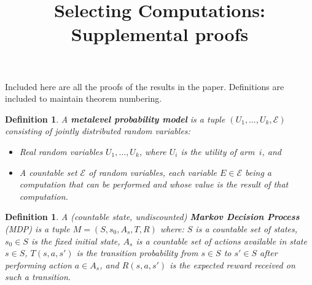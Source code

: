 \documentclass[]{article}
\title{Selecting Computations: Supplemental proofs}
\author{}
\newcommand {\term}[1] {\textbf{#1}}
\newcommand {\Evidence} {\mathcal{E}}
\newtheorem{dfn}[thm]{Definition}
\begin{document}
	
\maketitle

Included here are all the proofs of the results in the paper.
Definitions are included to maintain theorem numbering.

	\begin{dfn} \label{dfn:metalevel-model}
		A \term{metalevel probability model} is a tuple $(U_1,\dots,U_k,\Evidence)$ 
		consisting of jointly distributed random variables:
		\begin{itemize}
			\item Real random variables $U_1,\dots,U_k$, where $U_i$ is the utility of arm~$i$, and
			\item A countable set $\Evidence$ of random variables, each variable $E\in\Evidence$ being 
			      a computation that can be performed and whose value is the result of that computation.
		\end{itemize}
	\end{dfn}

	\begin{dfn}
	A (countable state, undiscounted) \term{Markov Decision Process} (MDP) is a tuple $M=(S,s_0,A_s,T,R)$ where:
		$S$ is a countable set of states,
		$s_0\in S$ is the fixed initial state,
		$A_s$ is a countable set of actions available in state $s\in S$,
		$T(s,a,s')$ is the transition probability from $s\in S$ to $s'\in S$ after performing action $a\in A_s$,
		and $R(s,a,s')$ is the expected reward received on such a transition.
	\end{dfn}
\end{document}
